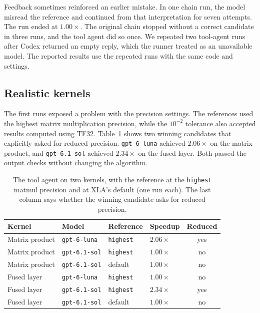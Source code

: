 \documentclass[conference]{IEEEtran}
\begin{document}
Feedback sometimes reinforced an earlier mistake. In one chain run,
the model misread the reference and continued from that interpretation
for seven attempts. The run ended at $1.00\times$. The original chain
stopped without a correct candidate in three runs, and the tool agent
did so once. We repeated two tool-agent runs after Codex returned an
empty reply, which the runner treated as an unavailable model. The
reported results use the repeated runs with the same code and settings.

\subsection{Realistic kernels}
\label{sec:kernels}

The first runs exposed a problem with the precision settings. The
references used the highest matrix multiplication precision, while the
$10^{-2}$ tolerance also accepted results computed using TF32. Table~\ref{tab:precision} shows two
winning candidates that explicitly asked for reduced precision.
\texttt{gpt-6-luna} achieved $2.06\times$ on the matrix product, and
\texttt{gpt-6.1-sol} achieved $2.34\times$ on the fused layer. Both
passed the output checks without changing the algorithm.

\begin{table}[t]
  \centering
  \caption{The tool agent on two kernels, with the reference at the
  \texttt{highest} matmul precision and at XLA's default (one run each).
  The last column says whether the winning candidate asks for reduced
  precision.}
  \label{tab:precision}
  \begin{tabular}{@{}llllc@{}}
    \toprule
    Kernel & Model & Reference & Speedup & Reduced \\
    \midrule
    Matrix product & \texttt{gpt-6-luna} & \texttt{highest} & $2.06\times$ & yes \\
    Matrix product & \texttt{gpt-6.1-sol} & \texttt{highest} & $1.00\times$ & no \\
    Matrix product & \texttt{gpt-6.1-sol} & default & $1.00\times$ & no \\
    Fused layer & \texttt{gpt-6-luna} & \texttt{highest} & $1.00\times$ & no \\
    Fused layer & \texttt{gpt-6.1-sol} & \texttt{highest} & $2.34\times$ & yes \\
    Fused layer & \texttt{gpt-6.1-sol} & default & $1.00\times$ & no \\
    \bottomrule
  \end{tabular}
\end{table}
\end{document}
